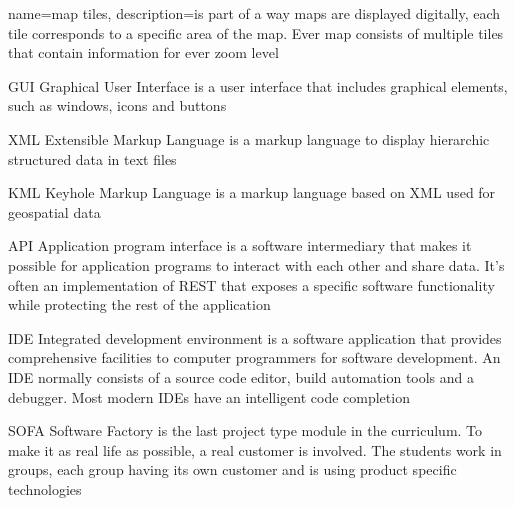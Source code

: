 {
  name=map tiles,
  description={is part of a way maps are displayed digitally, each tile corresponds to a specific area of the map. Ever map consists of multiple tiles that contain information for ever zoom level}
}



  {GUI}            %
  {Graphical User Interface}  %
  {is a user interface that includes graphical elements, such as windows, icons and buttons} %

  {XML}            %
  {Extensible Markup Language}  %
  {is a markup language to display hierarchic structured data in text files} %

  {KML}            %
  {Keyhole Markup Language}  %
  {is a markup language based on XML used for geospatial data} %

	{API}            %
	{Application program interface}  %
	{is a software intermediary that makes it possible for application programs to interact with each other and share data. It's often an implementation of REST that exposes a specific software functionality while protecting the rest of the application} %

	{IDE}            %
	{Integrated development environment}  %
	{is a software application that provides comprehensive facilities to computer programmers for software development. An IDE normally consists of a source code editor, build automation tools and a debugger. Most modern IDEs have an intelligent code completion} %

	{SOFA}            %
	{Software Factory}  %
	{is the last project type module in the curriculum. To make it as real life as possible, a real customer is involved. The students work in groups, each group having its own customer and is using product specific technologies\cite{FoSE14}} %
